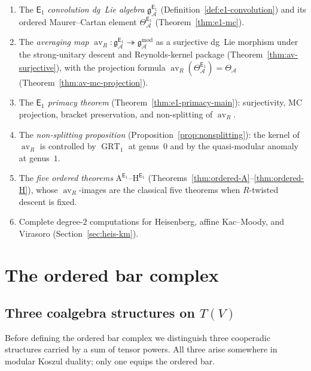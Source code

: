 \documentclass[11pt,reqno]{amsart}
\theoremstyle{definition}
\theoremstyle{remark}
\newcommand{\cA}{\mathcal{A}}
\newcommand{\Eone}{\mathsf{E}_{1}}
\DeclareMathOperator{\av}{av}
\DeclareMathOperator{\GRT}{GRT}
\newcommand{\gmod}{\mathfrak{g}^{\mathrm{mod}}_{\cA}}
\newcommand{\gEone}{\mathfrak{g}^{\Eone}_{\cA}}
\numberwithin{equation}{section}
\begin{document}
\begin{enumerate}[label=(\roman*)]
\item The $\Eone$ \emph{convolution dg~Lie algebra}
  $\gEone$ (Definition~\ref{def:e1-convolution}) and its
  ordered Maurer--Cartan element $\Theta^{\Eone}_\cA$
  (Theorem~\ref{thm:e1-mc}).

\item The \emph{averaging map} $\av_R\colon \gEone
  \twoheadrightarrow \gmod$ as a surjective dg~Lie morphism under the
  strong-unitary descent and Reynolds-kernel package
  (Theorem~\ref{thm:av-surjective}), with the projection
  formula $\av_R(\Theta^{\Eone}_\cA) = \Theta_\cA$
  (Theorem~\ref{thm:av-mc-projection}).

\item The \emph{$\Eone$ primacy theorem}
  (Theorem~\ref{thm:e1-primacy-main}): surjectivity, MC
  projection, bracket preservation, and non-splitting of $\av_R$.

\item The \emph{non-splitting proposition}
  (Proposition~\ref{prop:nonsplitting}): the kernel of $\av_R$
  is controlled by $\GRT_1$ at genus~$0$ and by the
  quasi-modular anomaly at genus~$1$.

\item The \emph{five ordered theorems}
  $\mathrm{A}^{\Eone}$--$\mathrm{H}^{\Eone}$
  (Theorems~\ref{thm:ordered-A}--\ref{thm:ordered-H}),
  whose $\av_R$-images are the classical five theorems when
  \(R\)-twisted descent is fixed.

\item Complete degree-$2$ computations for Heisenberg, affine
  Kac--Moody, and Virasoro (Section~\ref{sec:heis-km}).
\end{enumerate}

\section{The ordered bar complex}
\label{sec:ordered-bar}

\subsection{Three coalgebra structures on $T(V)$}

Before defining the ordered bar complex we distinguish three
cooperadic structures carried by a sum of tensor powers. All three
arise somewhere in modular Koszul duality; only one equips the
ordered bar.
\end{document}
